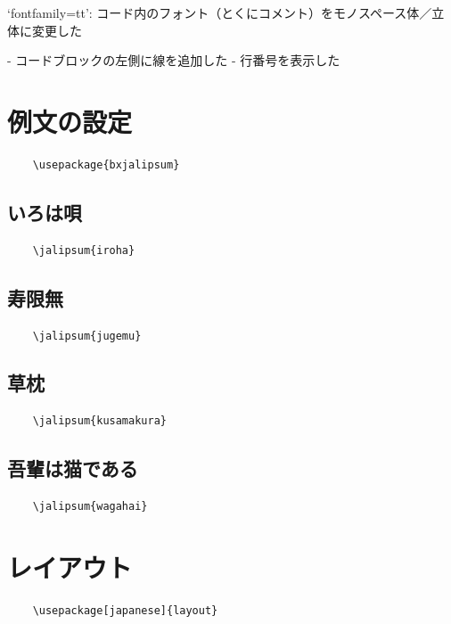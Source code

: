 \documentclass[article, head_space=25truemm, foot_space=15truemm, gutter=15truemm]{jlreq}
\begin{document}
\begin{markdown}
`fontfamily=tt':
コード内のフォント（とくにコメント）をモノスペース体／立体に変更した

- コードブロックの左側に線を追加した
- 行番号を表示した
\end{markdown}

\section{例文の設定}

\begin{verbatim}
    \usepackage{bxjalipsum}
\end{verbatim}

\subsection{いろは唄}

\begin{verbatim}
    \jalipsum{iroha}
\end{verbatim}

\subsection{寿限無}

\begin{verbatim}
    \jalipsum{jugemu}
\end{verbatim}

\subsection{草枕}

\begin{verbatim}
    \jalipsum{kusamakura}
\end{verbatim}


\subsection{吾輩は猫である}

\begin{verbatim}
    \jalipsum{wagahai}
\end{verbatim}


\section{レイアウト}

\begin{verbatim}
    \usepackage[japanese]{layout}
\end{verbatim}

\layout

\printbibliography[title={参考文献}]
\end{document}
